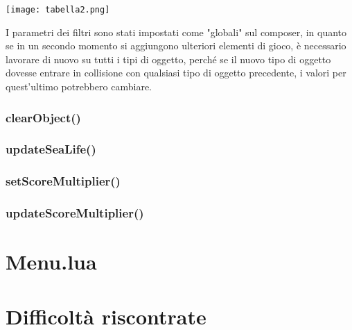 \documentclass[12pt]{article}
\begin{document}
\begin{center}
    \texttt{[image: tabella2.png]}\\
\end{center}

I parametri dei filtri sono stati impostati come "globali" sul composer, in quanto se in un secondo momento si aggiungono ulteriori 
elementi di gioco, è necessario lavorare di nuovo su tutti i tipi di oggetto, perché se il nuovo tipo di oggetto dovesse entrare in 
collisione con qualsiasi tipo di oggetto precedente, i valori per quest'ultimo potrebbero cambiare. 


\subsubsection{clearObject()}

\subsubsection{updateSeaLife()}

\subsubsection{setScoreMultiplier()}

\subsubsection{updateScoreMultiplier()}

\section{Menu.lua}


\section{Difficoltà riscontrate}
\end{document}
